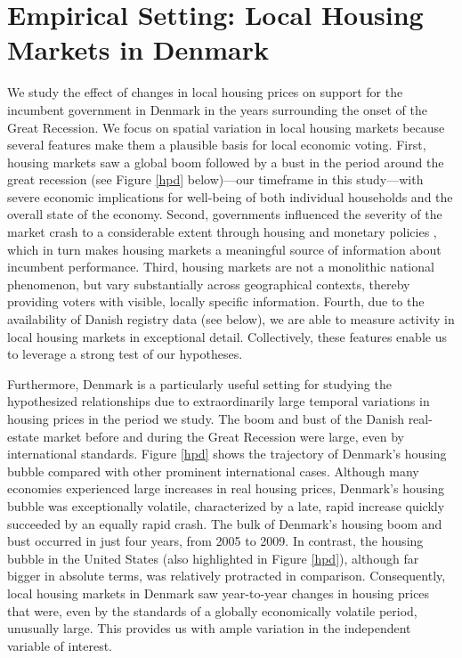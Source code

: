 \documentclass[12pt,a4paper]{article}
\begin{document}
	\section{Empirical Setting: Local Housing Markets in Denmark}
	We study the effect of changes in local housing prices on support for the incumbent government in Denmark in the years surrounding the onset of the Great Recession. We focus on spatial variation in local housing markets because several features make them a plausible basis for local economic voting. First, housing markets saw a global boom followed by a bust in the period around the great recession (see Figure \ref{hpd} below)—our timeframe in this study—with severe economic implications for well-being of both individual households and the overall state of the economy. Second, governments influenced the severity of the market crash to a considerable extent through housing and monetary policies \citep{dam2011housing}, which in turn makes housing markets a meaningful source of information about incumbent performance. Third, housing markets are not a monolithic national phenomenon, but vary substantially across geographical contexts, thereby providing voters with visible, locally specific information. Fourth, due to the availability of Danish registry data (see below), we are able to measure activity in local housing markets in exceptional detail. Collectively, these features enable us to leverage a strong test of our hypotheses.
	
	Furthermore, Denmark is a particularly useful setting for studying the hypothesized relationships due to extraordinarily large temporal variations in housing prices in the period we study. The boom and bust of the Danish real-estate market before and during the Great Recession were large, even by international standards. Figure \ref{hpd} shows the trajectory of Denmark's housing bubble compared with other prominent international cases. Although many economies experienced large increases in real housing prices, Denmark's housing bubble was exceptionally volatile, characterized by a late, rapid increase quickly succeeded by an equally rapid crash. The bulk of Denmark's housing boom and bust occurred in just four years, from 2005 to 2009. In contrast, the housing bubble in the United States (also highlighted in Figure \ref{hpd}), although far bigger in absolute terms, was relatively protracted in comparison. Consequently, local housing markets in Denmark saw year-to-year changes in housing prices that were, even by the standards of a globally economically volatile period, unusually large. This provides us with ample variation in the independent variable of interest.
	
\end{document}
